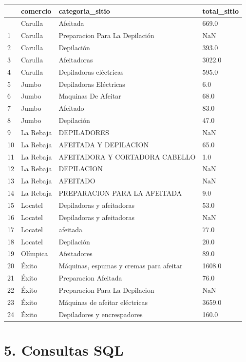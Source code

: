 \documentclass[
  spanish,
  letterpaper,
  DIV=11,
  numbers=noendperiod]{scrartcl}
\newcounter{none} %
\begin{document}
{\def\LTcaptype{none} %
\begin{longtable}[]{@{}llll@{}}
\toprule\noalign{}
& comercio & categoria\_sitio & total\_sitio \\
\midrule\noalign{}
\endhead
\bottomrule\noalign{}
\endlastfoot
0 & Carulla & Afeitada & 669.0 \\
1 & Carulla & Preparacion Para La Depilación & NaN \\
2 & Carulla & Depilación & 393.0 \\
3 & Carulla & Afeitadoras & 3022.0 \\
4 & Carulla & Depiladoras eléctricas & 595.0 \\
5 & Jumbo & Depiladoras Eléctricas & 6.0 \\
6 & Jumbo & Maquinas De Afeitar & 68.0 \\
7 & Jumbo & Afeitado & 83.0 \\
8 & Jumbo & Depilación & 47.0 \\
9 & La Rebaja & DEPILADORES & NaN \\
10 & La Rebaja & AFEITADA Y DEPILACION & 65.0 \\
11 & La Rebaja & AFEITADORA Y CORTADORA CABELLO & 1.0 \\
12 & La Rebaja & DEPILACION & NaN \\
13 & La Rebaja & AFEITADO & NaN \\
14 & La Rebaja & PREPARACION PARA LA AFEITADA & 9.0 \\
15 & Locatel & Depiladoras y afeitadoras & 53.0 \\
16 & Locatel & Depiladoras y afeitadoras & NaN \\
17 & Locatel & afeitada & 77.0 \\
18 & Locatel & Depilación & 20.0 \\
19 & Olímpica & Afeitadores & 89.0 \\
20 & Éxito & Máquinas, espumas y cremas para afeitar & 1608.0 \\
21 & Éxito & Preparacion Afeitada & 76.0 \\
22 & Éxito & Preparacion Para La Depilacion & NaN \\
23 & Éxito & Máquinas de afeitar eléctricas & 3659.0 \\
24 & Éxito & Depiladores y encrespadores & 160.0 \\
\end{longtable}
}

\section{5. Consultas SQL}\label{consultas-sql}
\end{document}
